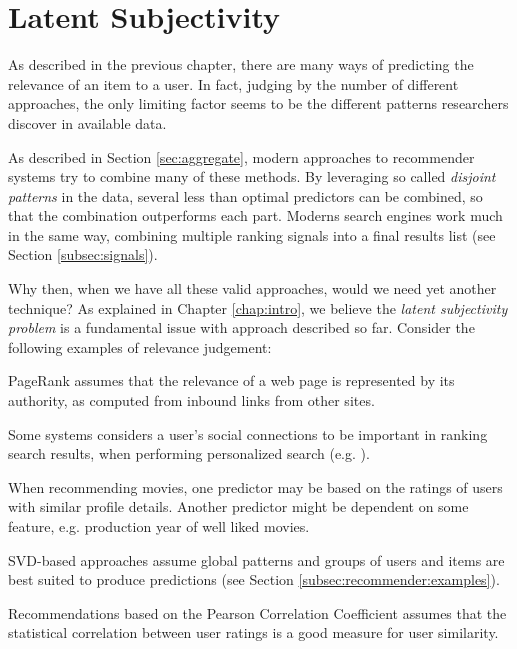 \section{Latent Subjectivity}
\label{sec:reasoning}

As described in the previous chapter, 
there are many ways of predicting the
relevance of an item to a user. 
In fact, judging by the number of different approaches,
the only limiting factor seems to be the different 
patterns researchers discover in available data.

As described in Section \ref{sec:aggregate},
modern approaches to recommender systems try to combine many of these methods.
By leveraging so called \emph{disjoint patterns}
in the data, several less than optimal predictors
can be combined, so that the combination outperforms each part.
Moderns search engines work much in the same way,
combining multiple ranking signals into a final results list
(see Section \ref{subsec:signals}).

Why then, when we have all these valid approaches, would we need yet another technique?
As explained in Chapter \ref{chap:intro}, 
we believe the \emph{latent subjectivity problem}
is a fundamental issue with approach described so far.
Consider the following examples of relevance judgement:

\begin{itemize*}
  \item PageRank \citep{Bender2005} assumes that the relevance of a web page is 
  represented by its authority, as computed from inbound links from other sites.
  \item Some systems considers a user's social connections to be important
  in ranking search results, when performing personalized search (e.g. \cite{Carmel2009}).
  \item When recommending movies, one predictor may be based on the ratings
  of users with similar profile details. Another predictor might be 
  dependent on some feature, e.g. production year of well liked movies.
  \item SVD-based approaches assume global patterns and groups of users and items
  are best suited to produce predictions (see Section \ref{subsec:recommender:examples}).
  \item Recommendations based on the Pearson Correlation Coefficient \cite[p11]{Segaran2007}
  assumes that the statistical correlation between user ratings is a good
  measure for user similarity.
\end{itemize*}

